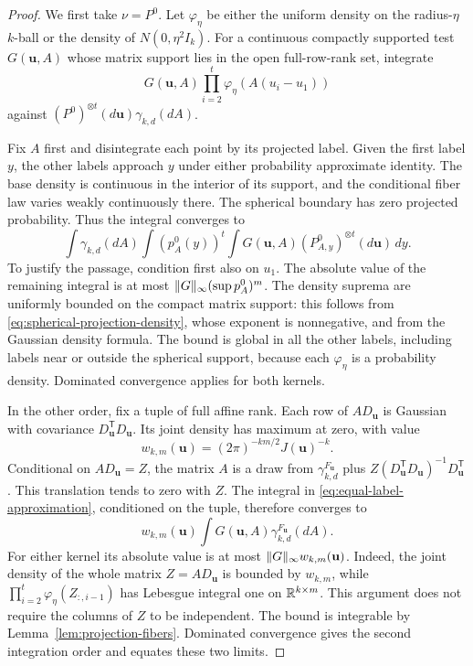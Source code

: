 \begin{proof}
We first take $\nu=P^0$. Let $\varphi_\eta$ be either the uniform density
on the radius-$\eta$ $k$-ball or the density of $N(0,\eta^2 I_k)$. For a
continuous compactly supported test $G(\mathbf u,A)$ whose matrix support
lies in the open full-row-rank set, integrate
\begin{equation}\label{eq:equal-label-approximation}
 G(\mathbf u,A)\prod_{i=2}^t\varphi_\eta(A(u_i-u_1))
\end{equation}
against $(P^0)^{\otimes t}(d\mathbf u)\gamma_{k,d}(dA)$.

Fix $A$ first and disintegrate each point by its projected label. Given the
first label $y$, the other labels approach $y$ under either probability
approximate identity. The base density is continuous in the interior of its
support, and the conditional fiber law varies weakly continuously there.
The spherical boundary has zero projected probability. Thus the integral
converges to
\[
 \int\gamma_{k,d}(dA)\int (p_A^0(y))^t
       \int G(\mathbf u,A)(P^0_{A,y})^{\otimes t}(d\mathbf u)\,dy.
\]
To justify the passage, condition first also on $u_1$. The absolute value
of the remaining integral is at most
$\lVert G\rVert_\infty(\sup p_A^0)^m$. The density suprema are uniformly bounded
on the compact matrix support: this follows from
\eqref{eq:spherical-projection-density}, whose exponent is nonnegative,
and from the Gaussian density formula. The bound is global in all the other
labels, including labels near or outside the spherical support, because
each $\varphi_\eta$ is a probability density. Dominated convergence applies
for both kernels.

In the other order, fix a tuple of full affine rank. Each row of
$AD_{\mathbf u}$ is Gaussian with covariance
$D_{\mathbf u}^{\mathsf T}D_{\mathbf u}$. Its joint density has maximum
at zero, with value
\[
 w_{k,m}(\mathbf u)=(2\pi)^{-km/2}J(\mathbf u)^{-k}.
\]
Conditional on $AD_{\mathbf u}=Z$, the matrix $A$ is a draw from
$\gamma_{k,d}^{F_{\mathbf u}}$ plus
$Z(D_{\mathbf u}^{\mathsf T}D_{\mathbf u})^{-1}D_{\mathbf u}^{\mathsf T}$.
This translation tends to zero with $Z$. The integral in
\eqref{eq:equal-label-approximation}, conditioned on the tuple, therefore
converges to
\[
 w_{k,m}(\mathbf u)\int G(\mathbf u,A)
                 \gamma_{k,d}^{F_{\mathbf u}}(dA).
\]
For either kernel its absolute value is at most
$\lVert G\rVert_\infty w_{k,m}(\mathbf u)$. Indeed, the joint density of the
whole matrix $Z=AD_{\mathbf u}$ is bounded by $w_{k,m}$, while
$\prod_{i=2}^t\varphi_\eta(Z_{:,i-1})$ has Lebesgue integral one on
$\mathbb R^{k\times m}$. This argument does not require the columns of $Z$ to be
independent. The bound is integrable by Lemma~\ref{lem:projection-fibers}.
Dominated convergence gives the second integration order and equates these
two limits.


\end{proof}
